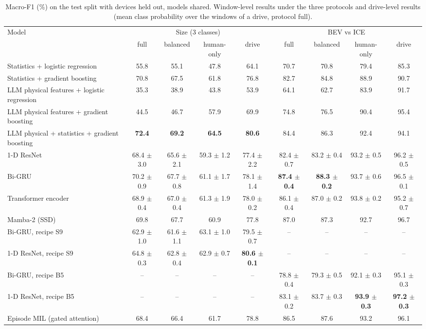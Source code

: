 \begin{table}[t]
\centering
\small
\caption{Macro-F1 (\%) on the test split with devices held out, models shared. Window-level results under the three protocols and drive-level results (mean class probability over the windows of a drive, protocol full).}
\label{tab:results_split_device}
\begin{tabular}{lcccccccc}
\toprule
Model & \multicolumn{4}{c}{Size (3 classes)} & \multicolumn{4}{c}{BEV vs ICE} \\
\cmidrule(lr){2-5} \cmidrule(lr){6-9}
 & full & balanced & human-only & drive & full & balanced & human-only & drive \\
\midrule
Statistics + logistic regression & 55.8 & 55.1 & 47.8 & 64.1 & 70.7 & 70.8 & 79.4 & 85.3 \\
Statistics + gradient boosting & 70.8 & 67.5 & 61.8 & 76.8 & 82.7 & 84.8 & 88.9 & 90.7 \\
LLM physical features + logistic regression & 35.3 & 38.9 & 43.8 & 53.9 & 64.1 & 62.7 & 83.9 & 91.7 \\
LLM physical features + gradient boosting & 44.5 & 46.7 & 57.9 & 69.9 & 74.8 & 76.5 & 90.4 & 95.4 \\
LLM physical + statistics + gradient boosting & \textbf{72.4} & \textbf{69.2} & \textbf{64.5} & \textbf{80.6} & 84.4 & 86.3 & 92.4 & 94.1 \\
1-D ResNet & 68.4 $\pm$ 3.0 & 65.6 $\pm$ 2.1 & 59.3 $\pm$ 1.2 & 77.4 $\pm$ 2.2 & 82.4 $\pm$ 0.7 & 83.2 $\pm$ 0.4 & 93.2 $\pm$ 0.5 & 96.2 $\pm$ 0.5 \\
Bi-GRU & 70.2 $\pm$ 0.9 & 67.7 $\pm$ 0.8 & 61.1 $\pm$ 1.7 & 78.1 $\pm$ 1.4 & \textbf{87.4 $\pm$ 0.4} & \textbf{88.3 $\pm$ 0.2} & 93.7 $\pm$ 0.6 & 96.5 $\pm$ 0.1 \\
Transformer encoder & 68.9 $\pm$ 0.4 & 67.0 $\pm$ 0.4 & 61.3 $\pm$ 1.9 & 78.0 $\pm$ 0.2 & 86.1 $\pm$ 0.4 & 87.0 $\pm$ 0.2 & 93.8 $\pm$ 0.2 & 95.2 $\pm$ 0.7 \\
Mamba-2 (SSD) & 69.8 & 67.7 & 60.9 & 77.8 & 87.0 & 87.3 & 92.7 & 96.7 \\
Bi-GRU, recipe S9 & 62.9 $\pm$ 1.0 & 61.6 $\pm$ 1.1 & 63.1 $\pm$ 1.0 & 79.5 $\pm$ 0.7 & -- & -- & -- & -- \\
1-D ResNet, recipe S9 & 64.8 $\pm$ 0.3 & 62.8 $\pm$ 0.4 & 62.9 $\pm$ 0.7 & \textbf{80.6 $\pm$ 0.1} & -- & -- & -- & -- \\
Bi-GRU, recipe B5 & -- & -- & -- & -- & 78.8 $\pm$ 0.4 & 79.3 $\pm$ 0.5 & 92.1 $\pm$ 0.3 & 95.1 $\pm$ 0.3 \\
1-D ResNet, recipe B5 & -- & -- & -- & -- & 83.1 $\pm$ 0.2 & 83.7 $\pm$ 0.3 & \textbf{93.9 $\pm$ 0.3} & \textbf{97.2 $\pm$ 0.3} \\
Episode MIL (gated attention) & 68.4 & 66.4 & 61.7 & 78.8 & 86.5 & 87.6 & 93.2 & 96.1 \\
\bottomrule
\end{tabular}
\end{table}
